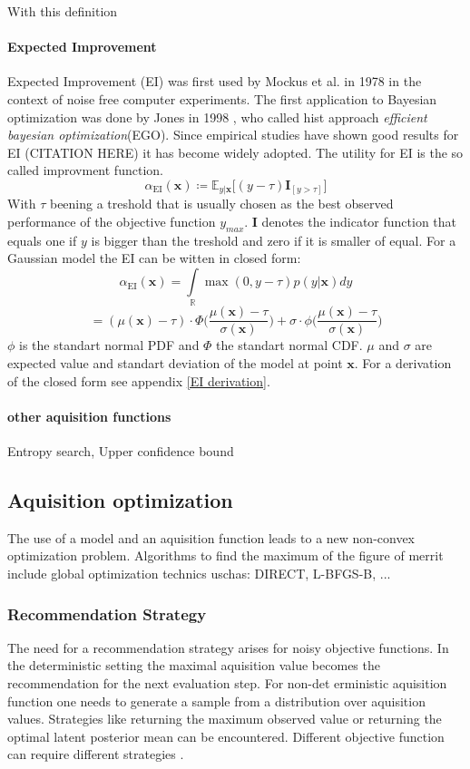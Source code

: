 \documentclass[english]{article}
\newcommand{\EI}{\operatorname{EI}}
\newcommand{\x}{\mathbf{x}}
\newcommand{\E}{\mathbb{E}}
\begin{document}
With this definition

\paragraph{Expected Improvement}
Expected Improvement (EI) was first used by Mockus et al. in 1978 \cite{mockus_application_1978} in the context of noise free computer experiments. The first application to Bayesian optimization was done by Jones in 1998 \cite{jones_efficient_1998}, who called hist approach \textit{efficient bayesian optimization}(EGO). Since empirical studies have shown good results for EI (CITATION HERE) it has become widely adopted. The utility for EI is the so called improvment function.
$$\alpha_{\EI}(\x) \coloneqq \E_{y|\x}\big[(y - \tau)\mathbf{I}_{[y > \tau]}\big]$$
With $\tau$ beening a treshold that is usually chosen as the best observed performance of the objective function $y_{max}$. $\mathbf{I}$ denotes the indicator function that equals one if $y$ is bigger than the treshold and zero if it is smaller of equal. For a Gaussian model the EI can be witten in closed form:
$$ \alpha_{\EI}(\x) = \int\limits_{\mathbb{R}} \max(0, y-\tau)p(y|\x)dy$$
$$= (\mu(\x) - \tau) \cdot \Phi \bigg(\frac{\mu(\x)-\tau}{\sigma(\x)}\bigg) + \sigma \cdot \phi \bigg(\frac{\mu(\x)-\tau}{\sigma(\x)}\bigg)$$
$\phi$ is the standart normal PDF and $\Phi$ the standart normal CDF. $\mu$ and $\sigma$ are expected value and standart deviation of the model at point $\x$.
For a derivation of the closed form see appendix \ref{EI derivation}.

\paragraph{other aquisition functions}
Entropy search, Upper confidence bound

\subsection*{Aquisition optimization}
The use of a model and an aquisition function leads to a new non-convex optimization problem. Algorithms to find the maximum of the figure of merrit include global optimization technics uschas: DIRECT, L-BFGS-B, ...

\subsubsection*{Recommendation Strategy}
The need for a recommendation strategy arises for noisy objective functions. In the deterministic setting the maximal aquisition value becomes the recommendation for the next evaluation step. For non-det erministic aquisition function one needs to generate a sample from a distribution over aquisition values. Strategies like returning the maximum observed value or returning the optimal latent posterior mean can be encountered. Different objective function can require different strategies \cite{hoffman_modular_2014}.
\end{document}
